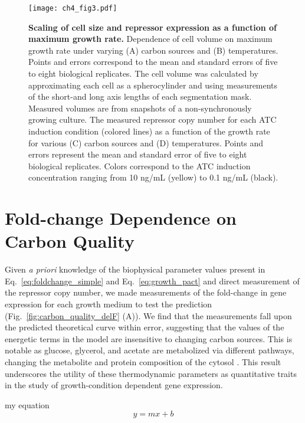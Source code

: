 \documentclass[12pt]{caltech_thesis}
\begin{document}
\hypertarget{fig:scaling}{%
\begin{figure}
\centering
\texttt{[image: ch4\_fig3.pdf]}
\caption[{Scaling of cel size and repressor expression as a function of
maximum growth rate}]{\textbf{Scaling of cell size and repressor
expression as a function of maximum growth rate.} Dependence of cell
volume on maximum growth rate under varying (A) carbon sources and (B)
temperatures. Points and errors correspond to the mean and standard
errors of five to eight biological replicates. The cell volume was
calculated by approximating each cell as a spherocylinder and using
measurements of the short-and long axis lengths of each segmentation
mask. Measured volumes are from snapshots of a non-synchronously growing
culture. The measured repressor copy number for each ATC induction
condition (colored lines) as a function of the growth rate for various
(C) carbon sources and (D) temperatures. Points and errors represent the
mean and standard error of five to eight biological replicates. Colors
correspond to the ATC induction concentration ranging from 10 ng/mL
(yellow) to 0.1 ng/mL (black).}
\label{fig:scaling}
\end{figure}
}

\hypertarget{fold-change-dependence-on-carbon-quality}{%
\section{Fold-change Dependence on Carbon
Quality}\label{fold-change-dependence-on-carbon-quality}}

Given \emph{a priori} knowledge of the biophysical parameter values
\autocite{garcia2011,razo-mejia2018} present in
Eq.~\ref{eq:foldchange_simple} and Eq.~\ref{eq:growth_pact} and direct
measurement of the repressor copy number, we made measurements of the
fold-change in gene expression for each growth medium to test the
prediction (Fig.~\ref{fig:carbon_quality_delF} (A)). We find that the
measurements fall upon the predicted theoretical curve within error,
suggesting that the values of the energetic terms in the model are
insensitive to changing carbon sources. This is notable as glucose,
glycerol, and acetate are metabolized via different pathways, changing
the metabolite and protein composition of the cytosol
\autocite{martinez-gomez2012,kim2007}. This result underscores the
utility of these thermodynamic parameters as quantitative traits in the
study of growth-condition dependent gene expression.

my equation \[
y = mx + b
\]
\end{document}
